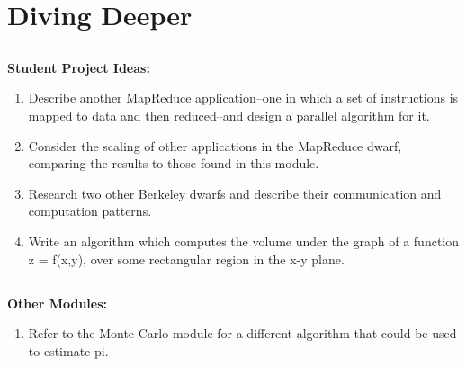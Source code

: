 \documentclass[a4paper, 11pt]{article}
\begin{document}

\section{Diving Deeper}


\subsection*{}

\textbf{Student Project Ideas:}

\begin{enumerate}
\setcounter{enumi}{0}
\item Describe another MapReduce application--one in which a set of instructions is mapped to data and then reduced--and design a parallel algorithm for it.
\item Consider the scaling of other applications in the MapReduce dwarf, comparing the results to those found in this module.
\item Research two other Berkeley dwarfs and describe their communication and computation patterns.
\item Write an algorithm which computes the volume under the graph of a function z = f(x,y), over some rectangular region in the x-y plane.
\end{enumerate}


\subsection*{}

\textbf{Other Modules:}

\begin{enumerate}
\setcounter{enumi}{0}
\item Refer to the Monte Carlo module for a different algorithm that could be used to estimate pi.
\end{enumerate}




\begin{flushleft}

\end{flushleft}




\end{document}
